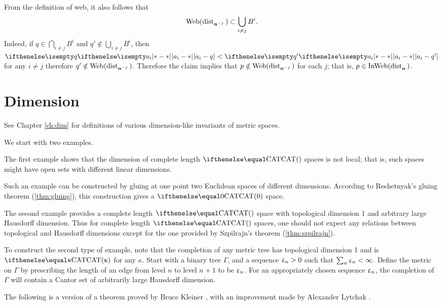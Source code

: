 From the definition of web, it also follows that 
\[\Web(\distfun{\bm{a}^{\without j}}{}{})\subset \bigcup_{i\ne j}B^i.\]
Indeed, if $q\in \bigcap_{i\ne j}B^i$ and $q'\notin \bigcup_{i\ne j}B^i$,
then $\dist{a_i}{q}{}\z<\dist{a_i}{q'}{}$ for any $i\ne j$ therefore $q'\notin \mathop{\rm Web}\nolimits(\mathop{\rm dist}\nolimits_{\bm{a}^{{-} j}}^{{}}{}{})$.
Therefore the claim implies that
$p\notin\mathop{\rm Web}\nolimits(\mathop{\rm dist}\nolimits_{\bm{a}^{{-} j}}^{{}}{}{})$ for each $j$;
that is, $p\in\InWeb(\distfun{\bm{a}}{}{})$.
\qeds


\section{Dimension}\label{sec:dim-cba}

See Chapter \ref{ch:dim} for definitions of various dimension-like invariants of metric spaces.

We start with two examples.

The first example shows that the dimension of complete length $\CAT{}$ spaces is not local;
that is, such spaces might have open sets with different linear dimensions.

Such an example can be constructed by gluing at one point two Euclidean spaces of different dimensions.
According to Reshetnyak's gluing theorem (\ref{thm:gluing}), this construction gives a $\CAT{0}$ space.

The second example provides a complete length $\CAT{}$ space 
with topological dimension 1 and arbitrary large Hausdorff dimension.
Thus for complete length $\CAT{}$ spaces, one should not expect any relations between topological and Hausdorff dimensions except for the one provided by Szpilrajn's theorem (\ref{thm:szpilrajn}).

To construct the second type of example,
note that the completion of any metric tree has topological dimension 1 and is $\CAT\kappa$ for any $\kappa$.
Start with a binary tree $\Gamma$, and a sequence $\upvarepsilon_n>0$ such that $\sum_n\upvarepsilon_n<\infty$.
Define the metric on $\Gamma$
by prescribing the length of an edge from level $n$ to level $n+1$ to be $\upvarepsilon_n$.
For an appropriately chosen sequence $\upvarepsilon_n$, the completion of $\Gamma$ will contain a Cantor set of arbitrarily large Hausdorff dimension.

\medskip

The following is a version of a theorem proved by Bruce Kleiner \cite{kleiner}, with an improvement made by Alexander Lytchak \cite{lytchak:diff}.

